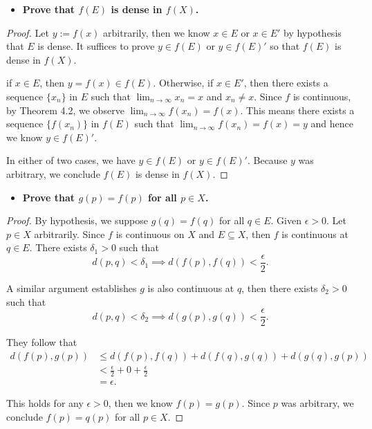 \begin{Exercise}
	\begin{itemize}
		\item \textbf{Prove that $f(E)$ is dense in $f(X)$.}
	\end{itemize}
	\begin{proof}
		Let $y := f(x)$ arbitrarily, then we know $x\in E$ or $x\in E'$ by hypothesis that $E$ is dense. It suffices to prove $y\in f(E)$ or $y\in f(E)'$ so that $f(E)$ is dense in $f(X)$.
		
		if $x\in E$, then $y=f(x)\in f(E)$. Otherwise, if $x\in E'$, then there exists a sequence $\{x_n\}$ in $E$ such that $\lim_{n\to\infty} x_n = x$ and $x_n \neq x$. Since $f$ is continuous, by Theorem 4.2, we observe $\lim_{n\to\infty} f(x_n) = f(x)$. This means there exists a sequence $\{f(x_n)\}$ in $f(E)$ such that $\lim_{n\to\infty} f(x_n) = f(x) = y$ and hence we know $y\in f(E)'$.
		
		In either of two cases, we have $y\in f(E)$ or $y\in f(E)'$. Because $y$ was arbitrary, we conclude $f(E)$ is dense in $f(X)$.
	\end{proof}
	
	\begin{itemize}
		\item \textbf{Prove that $g(p) = f(p)$ for all $p\in X$.}
	\end{itemize}
	\begin{proof}
		By hypothesis, we suppose $g(q) = f(q)$ for all $q\in E$. Given $\epsilon>0$. Let $p\in X$ arbitrarily. Since $f$ is continuous on $X$ and $E\subseteq X$, then $f$ is continuous at $q\in E$. There exists $\delta_1>0$ such that
		$$
		d(p,q)<\delta_1 \implies d(f(p),f(q))<\frac{\epsilon}{2}.
		$$
		
		A similar argument establishes $g$ is also continuous at $q$, then there exists $\delta_2>0$ such that
		$$
		d(p,q)<\delta_2 \implies d(g(p),g(q))<\frac{\epsilon}{2}.
		$$
		
		They follow that
		\begin{align*}
		d(f(p),g(p))
		&\leq d(f(p), f(q)) + d(f(q), g(q)) + d(g(q), g(p)) \\
		&< \frac{\epsilon}{2} + 0 + \frac{\epsilon}{2} \\
		&= \epsilon.
		\end{align*}
		
		This holds for any $\epsilon>0$, then we know $f(p)=g(p)$. Since $p$ was arbitrary, we conclude $f(p)=q(p)$ for all $p\in X$.
	\end{proof}
\end{Exercise}